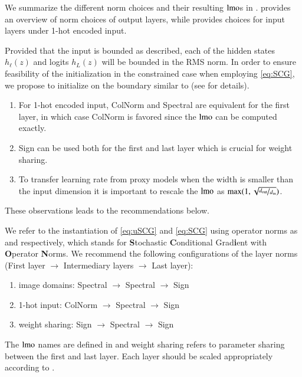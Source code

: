We summarize the different norm choices and their resulting $\operatorname{lmo}$s in .
 provides an overview of norm choices of output layers, while  provides choices for input layers under 1-hot encoded input.

Provided that the input is bounded as described, each of the hidden states $h_\ell(z)$ and logits $h_L(z)$ will be bounded in the RMS norm.
In order to ensure feasibility of the initialization in the constrained case when employing \ref{eq:SCG},
we propose to initialize on the boundary similar to \citet{large2024scalable} (see  for details).


\begin{insightbox}[label={insight:norm-choice}]
\begin{enumerate}[label=(\roman*)]
  \item For 1-hot encoded input, ColNorm and Spectral are equivalent for the first layer, in which case ColNorm is favored since the $\operatorname{lmo}$ can be computed exactly.
  \item Sign can be used both for the first and last layer which is crucial for weight sharing.
  \item To transfer learning rate from proxy models when the width is smaller than the input dimension it is important to rescale the $\operatorname{lmo}$ as $\max(1,\sqrt{\nicefrac{d_\mathrm{out}}{d_\mathrm{in}}})$.
\end{enumerate}
\end{insightbox}
These observations leads to the recommendations below.
\begin{recommendationbox}[label={recomm:instanciation}]
We refer to the instantiation of \ref{eq:uSCG} and \ref{eq:SCG} using operator norms as \uScion and \Scion respectively,
which stands for \textbf{S}tochastic \textbf{C}onditional Grad\textbf{i}ent with \textbf{O}perator \textbf{N}orms.
We recommend the following configurations of the layer norms (First layer $\rightarrow$ Intermediary layers $\rightarrow$ Last layer):
\begin{enumerate}[label=(\roman*)]
\item image domains: \hfill Spectral $\rightarrow$ Spectral $\rightarrow$ Sign
\item 1-hot input: \hfill ColNorm $\rightarrow$ Spectral $\rightarrow$ Sign
\item weight sharing: \hfill Sign $\rightarrow$ Spectral $\rightarrow$ Sign
\end{enumerate}
The $\operatorname{lmo}$ names are defined in  and weight sharing refers to parameter sharing between the first and last layer.
Each layer should be scaled appropriately according to . 
\end{recommendationbox}



